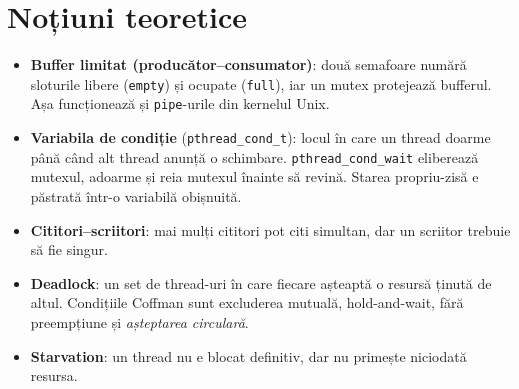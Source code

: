 \documentclass[11pt,a4paper]{article}
\begin{document}
\section*{Noțiuni teoretice}
\begin{itemize}[leftmargin=*]
  \item \textbf{Buffer limitat (producător--consumator)}: două semafoare numără sloturile libere (\texttt{empty}) și
        ocupate (\texttt{full}), iar un mutex protejează bufferul. Așa funcționează și \texttt{pipe}-urile din kernelul Unix.
  \item \textbf{Variabila de condiție} (\texttt{pthread\_cond\_t}): locul în care un thread doarme până când alt thread
        anunță o schimbare. \texttt{pthread\_cond\_wait} eliberează mutexul, adoarme și reia mutexul înainte să revină.
        Starea propriu-zisă e păstrată într-o variabilă obișnuită.
  \item \textbf{Cititori--scriitori}: mai mulți cititori pot citi simultan, dar un scriitor trebuie să fie singur.
  \item \textbf{Deadlock}: un set de thread-uri în care fiecare așteaptă o resursă ținută de altul. Condițiile Coffman
        sunt excluderea mutuală, hold-and-wait, fără preempțiune și \emph{așteptarea circulară}.
  \item \textbf{Starvation}: un thread nu e blocat definitiv, dar nu primește niciodată resursa.
\end{itemize}

\end{document}
